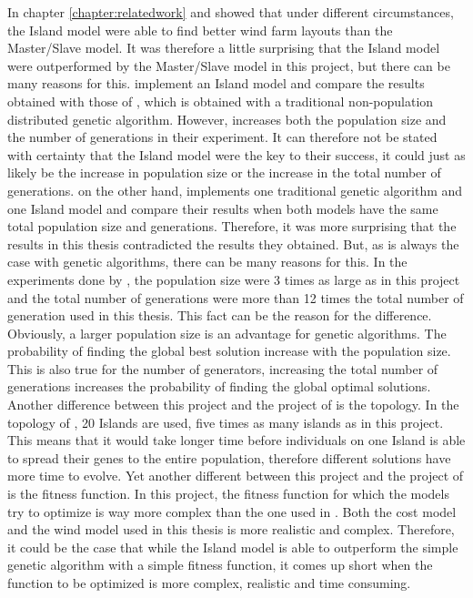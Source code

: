\noindent In chapter \ref{chapter:relatedwork} \cite{Grady} and \cite{Huang} showed that under different circumstances, the Island model were able to find better wind farm layouts than the Master/Slave model. It was therefore a little surprising that the Island model were outperformed by the Master/Slave model in this project, but there can be many reasons for this. \cite{Grady} implement an Island model and compare the results obtained with those of \cite{Mosetti}, which is obtained with a traditional non-population distributed genetic algorithm. However, \cite{Grady} increases both the population size and the number of generations in their experiment. It can therefore not be stated with certainty that the Island model were the key to their success, it could just as likely be the increase in population size or the increase in the total number of generations. \cite{Huang} on the other hand, implements one traditional genetic algorithm and one Island model and compare their results when both models have the same total population size and generations. Therefore, it was more surprising that the results in this thesis contradicted the results they obtained. But, as is always the case with genetic algorithms, there can be many reasons for this. In the experiments done by \cite{Huang}, the population size were 3 times as large as in this project and the total number of generations were more than 12 times the total number of generation used in this thesis. This fact can be the reason for the difference. Obviously, a larger population size is an advantage for genetic algorithms. The probability of finding the global best solution increase with the population size. This is also true for the number of generators, increasing the total number of generations increases the probability of finding the global optimal solutions. Another difference between this project and the project of \cite{Huang} is the topology. In the topology of \cite{Huang}, 20 Islands are used, five times as many islands as in this project. This means that it would take longer time before individuals on one Island is able to spread their genes to the entire population, therefore different solutions have more time to evolve. Yet another different between this project and the project of \cite{Huang} is the fitness function. In this project, the fitness function for which the models try to optimize is way  more complex than the one used in \cite{Huang}. Both the cost model and the wind model used in this thesis is more realistic and complex. Therefore, it could be the case that while the Island model is able to outperform the simple genetic algorithm with a simple fitness function, it comes up short when the function to be optimized is more complex, realistic and time consuming. \\


